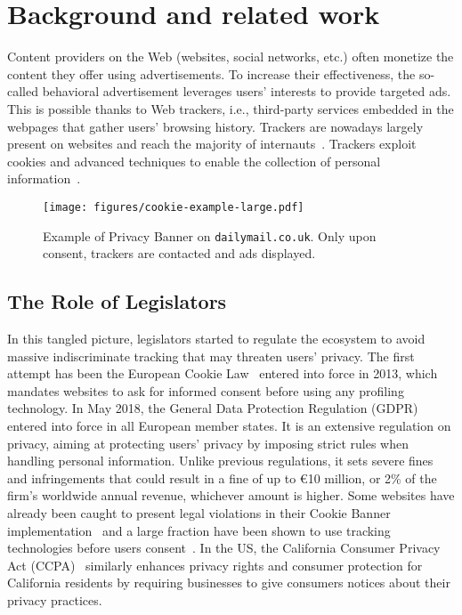 \section{Background and related work}
\label{sec:history}

Content providers on the Web (websites, social networks, etc.) often monetize the content they offer using advertisements. To increase their effectiveness, the so-called behavioral advertisement leverages users' interests to provide targeted ads. This is possible thanks to Web trackers, i.e., third-party services embedded in the webpages that gather users' browsing history. Trackers are nowadays largely present on websites and reach the majority of internauts~\cite{metwalley2015online,pujol2015annoyed}. Trackers exploit cookies and advanced techniques to enable the collection of personal information~\cite{acar2014web,rizzo2021unveiling,papadogiannakis2021user}.


\begin{figure}[t]
    \centering
    \texttt{[image: figures/cookie-example-large.pdf]}
    \caption{Example of Privacy Banner on \texttt{dailymail.co.uk}. Only upon consent, trackers are contacted and ads displayed.}
    \label{fig:cookie_accept_example}
\end{figure}

\subsection{The Role of Legislators}

In this tangled picture, legislators started to regulate the ecosystem to avoid massive indiscriminate tracking that may threaten users' privacy. The first attempt has been the European Cookie Law~\cite{directive2009} entered into force in 2013, which mandates websites to ask for informed consent before using any profiling technology. In May 2018, the General Data Protection Regulation (GDPR)~\cite{gpdr} entered into force in all European member states. It is an extensive regulation on privacy, aiming at protecting users' privacy by imposing strict rules when handling personal information. Unlike previous regulations, it sets severe fines and infringements that could result in a fine of up to €10 million, or 2\% of the firm's worldwide annual revenue, whichever amount is higher. Some websites have already been caught to present legal violations in their Cookie Banner implementation~\cite{matte2020cookie} and a large fraction have been shown to use tracking technologies before users consent~\cite{trevisan20194, sanchez2019can}. In the US, the California Consumer Privacy Act (CCPA)~\cite{ccpa} similarly enhances privacy rights and consumer protection for California residents by requiring businesses to give consumers notices about their privacy practices.

